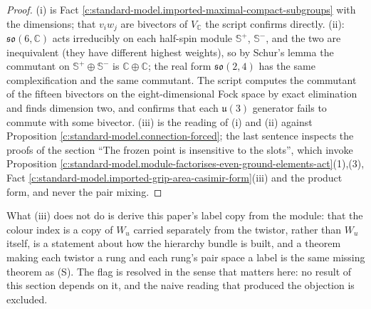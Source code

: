 \documentclass[11pt]{article}
\theoremstyle{definition}
\theoremstyle{plain}
\providecommand{\C}{}\renewcommand{\C}{\mathbb{C}}
\providecommand{\CS}{}\renewcommand{\CS}{{\mathbb{S}^{+}}}
\providecommand{\CSm}{}\renewcommand{\CSm}{{\mathbb{S}^{-}}}
\providecommand{\so}{}\renewcommand{\so}{\mathfrak{so}}
\providecommand{\uu}{}\renewcommand{\uu}{\mathfrak{u}}
\begin{document}
\begin{proof}
(i) is Fact \ref{c:standard-model.imported-maximal-compact-subgroups} with the dimensions; that $v_{i}w_{j}$ are bivectors of $V_{\C}$ the script confirms directly. (ii): $\so(6,\C)$ acts irreducibly on each half-spin module $\CS$, $\CSm{}$, and the two are inequivalent (they have different highest weights), so by Schur's lemma the commutant on $\CS \oplus \CSm{}$ is $\C \oplus \C$; the real form $\so(2,4)$ has the same complexification and the same commutant. The script computes the commutant of the fifteen bivectors on the eight-dimensional Fock space by exact elimination and finds dimension two, and confirms that each $\uu(3)$ generator fails to commute with some bivector. (iii) is the reading of (i) and (ii) against Proposition \ref{c:standard-model.connection-forced}; the last sentence inspects the proofs of the section ``The frozen point is insensitive to the slots'', which invoke Proposition \ref{c:standard-model.module-factorises-even-ground-elements-act}(1),(3), Fact \ref{c:standard-model.imported-grip-area-casimir-form}(iii) and the product form, and never the pair mixing.

\end{proof}

\label{c:note.standard-model.setting-two-flags-resolved-2}
What (iii) does not do is derive this paper's label copy from the module: that the colour index is a copy of $W_{u}$ carried separately from the twistor, rather than $W_{u}$ itself, is a statement about how the hierarchy bundle is built, and a theorem making each twistor a rung and each rung's pair space a label is the same missing theorem as (S). The flag is resolved in the sense that matters here: no result of this section depends on it, and the naive reading that produced the objection is excluded.
\end{document}
